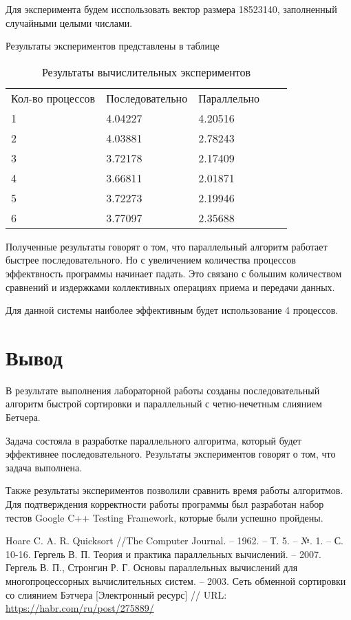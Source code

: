 \documentclass{report}
\begin{document}
\par Для эксперимента будем исспользовать вектор размера 18523140, заполненный случайными целыми числами. 
\par Результаты экспериментов представлены в таблице
\begin{table}[!h]
\caption{Результаты вычислительных экспериментов}
\centering
\begin{tabular}{lllll}
Кол-во процессов  & Последовательно & Параллельно \\
1      & 4.04227         & 4.20516  \\
2     & 4.03881         & 2.78243  \\
3     & 3.72178         & 2.17409 \\
4     & 3.66811        & 2.01871 \\
5     &3.72273         & 2.19946  \\
6     &3.77097         & 2.35688  

\end{tabular}
\end{table}

\par Полученные результаты говорят о том, что параллельный алгоритм работает быстрее последовательного. Но с увеличением количества процессов эффектвность программы начинает падать. Это связано с большим количеством сравнений и издержками коллективных операциях приема и передачи данных.
\par Для данной системы наиболее эффективным будет использование 4 процессов.
\newpage

\section*{Вывод}
В результате выполнения лабораторной работы созданы последовательный алгоритм быстрой сортировки и параллельный с четно-нечетным слиянием Бетчера.
\par Задача состояла в разработке параллельного алгоритма, который будет эффективнее последовательного. Результаты экспериментов говорят о том, что задача выполнена.
\par Также результаты экспериментов позволили сравнить время работы алгоритмов. Для подтверждения корректности работы программы был разработан набор тестов Google C++
Testing Framework, которые были успешно пройдены.

\newpage

\begin{thebibliography}{1}
Hoare C. A. R. Quicksort //The Computer Journal. – 1962. – Т. 5. – №. 1. – С. 10-16.
Гергель В. П. Теория и практика параллельных вычислений. – 2007. 
Гергель В. П., Стронгин Р. Г. Основы параллельных вычислений для многопроцессорных вычислительных систем. – 2003.
 Сеть обменной сортировки со слиянием Бэтчера [Электронный ресурс] // URL: \url{https://habr.com/ru/post/275889/}
\end{thebibliography}
\newpage
\end{document}
